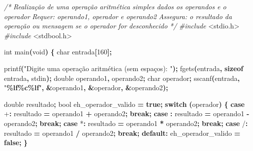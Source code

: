 \documentclass[
  11pt,
  a4paper,
]{scrbook}
\newenvironment{Shaded}{\begin{snugshade}}{\end{snugshade}}
\newcommand{\CharTok}[1]{\textcolor[rgb]{0.31,0.60,0.02}{#1}}
\newcommand{\CommentTok}[1]{\textcolor[rgb]{0.56,0.35,0.01}{\textit{#1}}}
\newcommand{\ControlFlowTok}[1]{\textcolor[rgb]{0.13,0.29,0.53}{\textbf{#1}}}
\newcommand{\DataTypeTok}[1]{\textcolor[rgb]{0.13,0.29,0.53}{#1}}
\newcommand{\DecValTok}[1]{\textcolor[rgb]{0.00,0.00,0.81}{#1}}
\newcommand{\ImportTok}[1]{#1}
\newcommand{\KeywordTok}[1]{\textcolor[rgb]{0.13,0.29,0.53}{\textbf{#1}}}
\newcommand{\NormalTok}[1]{#1}
\newcommand{\OperatorTok}[1]{\textcolor[rgb]{0.81,0.36,0.00}{\textbf{#1}}}
\newcommand{\PreprocessorTok}[1]{\textcolor[rgb]{0.56,0.35,0.01}{\textit{#1}}}
\newcommand{\SpecialCharTok}[1]{\textcolor[rgb]{0.81,0.36,0.00}{\textbf{#1}}}
\newcommand{\StringTok}[1]{\textcolor[rgb]{0.31,0.60,0.02}{#1}}
\begin{document}
\begin{Shaded}
\begin{Highlighting}[]
\CommentTok{/*}
\CommentTok{Realização de uma operação aritmética simples dados os operandos e o}
\CommentTok{    operador}
\CommentTok{Requer: operando1, operador e operando2}
\CommentTok{Assegura: o resultado da operação ou mensagem se o operador for}
\CommentTok{    desconhecido}
\CommentTok{*/}
\PreprocessorTok{\#include }\ImportTok{\textless{}stdio.h\textgreater{}}
\PreprocessorTok{\#include }\ImportTok{\textless{}stdbool.h\textgreater{}}

\DataTypeTok{int}\NormalTok{ main}\OperatorTok{(}\DataTypeTok{void}\OperatorTok{)} \OperatorTok{\{}
    \DataTypeTok{char}\NormalTok{ entrada}\OperatorTok{[}\DecValTok{160}\OperatorTok{];}

\NormalTok{    printf}\OperatorTok{(}\StringTok{"Digite uma operação aritmética (sem espaços): "}\OperatorTok{);}
\NormalTok{    fgets}\OperatorTok{(}\NormalTok{entrada}\OperatorTok{,} \KeywordTok{sizeof}\NormalTok{ entrada}\OperatorTok{,}\NormalTok{ stdin}\OperatorTok{);}
    \DataTypeTok{double}\NormalTok{ operando1}\OperatorTok{,}\NormalTok{ operando2}\OperatorTok{;}
    \DataTypeTok{char}\NormalTok{ operador}\OperatorTok{;}
\NormalTok{    sscanf}\OperatorTok{(}\NormalTok{entrada}\OperatorTok{,} \StringTok{"}\SpecialCharTok{\%lf\%c\%lf}\StringTok{"}\OperatorTok{,} \OperatorTok{\&}\NormalTok{operando1}\OperatorTok{,} \OperatorTok{\&}\NormalTok{operador}\OperatorTok{,} \OperatorTok{\&}\NormalTok{operando2}\OperatorTok{);}

    \DataTypeTok{double}\NormalTok{ resultado}\OperatorTok{;}
    \DataTypeTok{bool}\NormalTok{ eh\_operador\_valido }\OperatorTok{=} \KeywordTok{true}\OperatorTok{;}
    \ControlFlowTok{switch} \OperatorTok{(}\NormalTok{operador}\OperatorTok{)} \OperatorTok{\{}
        \ControlFlowTok{case} \CharTok{\textquotesingle{}+\textquotesingle{}}\OperatorTok{:}
\NormalTok{            resultado }\OperatorTok{=}\NormalTok{ operando1 }\OperatorTok{+}\NormalTok{ operando2}\OperatorTok{;}
            \ControlFlowTok{break}\OperatorTok{;}
        \ControlFlowTok{case} \CharTok{\textquotesingle{}{-}\textquotesingle{}}\OperatorTok{:}
\NormalTok{            resultado }\OperatorTok{=}\NormalTok{ operando1 }\OperatorTok{{-}}\NormalTok{ operando2}\OperatorTok{;}
            \ControlFlowTok{break}\OperatorTok{;}
        \ControlFlowTok{case} \CharTok{\textquotesingle{}*\textquotesingle{}}\OperatorTok{:}
\NormalTok{            resultado }\OperatorTok{=}\NormalTok{ operando1 }\OperatorTok{*}\NormalTok{ operando2}\OperatorTok{;}
            \ControlFlowTok{break}\OperatorTok{;}
        \ControlFlowTok{case} \CharTok{\textquotesingle{}/\textquotesingle{}}\OperatorTok{:}
\NormalTok{            resultado }\OperatorTok{=}\NormalTok{ operando1 }\OperatorTok{/}\NormalTok{ operando2}\OperatorTok{;}
            \ControlFlowTok{break}\OperatorTok{;}
        \ControlFlowTok{default}\OperatorTok{:}
\NormalTok{            eh\_operador\_valido }\OperatorTok{=} \KeywordTok{false}\OperatorTok{;}
    \OperatorTok{\}}


\end{Highlighting}
\end{Shaded}
\end{document}
